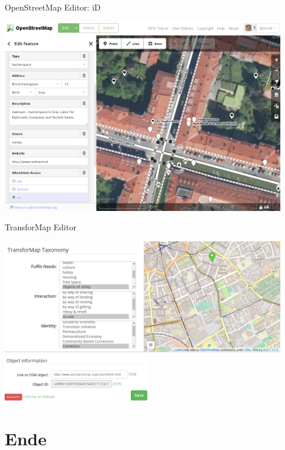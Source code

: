 \documentclass{beamer}
\begin{document}
\begin{frame}{OpenStreetMap Editor: iD}

 \hspace*{-1cm}  \includegraphics[width=12.5cm]{iD.png}

\end{frame}
%


\begin{frame}{TransforMap Editor}

 \hspace*{-1cm}  \includegraphics[width=12.5cm]{tm.png} \\
 \hspace*{-1cm}  \includegraphics[width=6.5cm]{tm2.png}

\end{frame}


\section{Ende}
\end{document}
